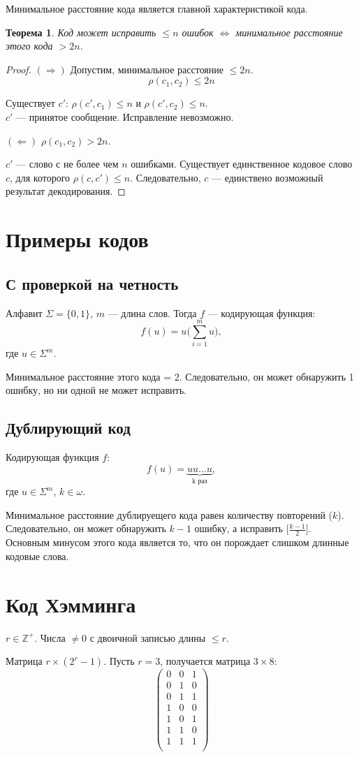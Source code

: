 \documentclass[a4paper,14pt, draft]{report}
\newtheorem{theorem}{Теорема}
\begin{document}
Минимальное расстояние кода является главной характеристикой кода.

\begin{theorem}Код может исправить $\le n$ ошибок $\Leftrightarrow$ минимальное расстояние этого кода $>2n$.
\end{theorem}
\begin{proof}$(\Rightarrow)$ Допустим, минимальное расстояние $\le 2n$. $$\rho(c_1, c_2)\le 2n$$

Существует $c'$: $\rho(c', c_1)\le n$ и $\rho(c', c_2)\le n$.\\$c'$ --- принятое сообщение. Исправление невозможно.

$(\Leftarrow)$ $\rho(c_1, c_2) > 2n$.

$c'$ --- слово с не более чем $n$ ошибками. Существует единственное кодовое слово $c$, для которого $\rho(c, c')\le n$. Следовательно, $c$ --- единствено возможный результат декодирования.
\end{proof}
\section{Примеры кодов}
\subsection{С проверкой на четность}
Алфавит $\Sigma = \{0, 1\}$, $m$ --- длина слов. Тогда $f$ --- кодирующая функция: $$f(u) = u \Big(\sum^m_{i=1} u\Big),$$ где $u\in\Sigma^m$.

Минимальное расстояние этого кода = 2. Следовательно, он может обнаружить 1 ошибку, но ни одной не может исправить.
\subsection{Дублирующий код}
Кодирующая функция $f$: $$f(u) = \underbrace{uu\ldots u}_\text{k раз},$$ где $u\in\Sigma^m$, $k\in\omega$.

Минимальное расстояние дублируещего кода равен количеству повторений ($k$). Следовательно, он может обнаружить $k-1$ ошибку, а исправить $\big[\frac{k-1}{2}\big]$. Основным минусом этого кода является то, что он порождает слишком длинные кодовые слова.
\section{Код Хэмминга}
$r\in\mathbb{Z^+}$. Числа $\neq0$ с двоичной записью длины $\le r$.

Матрица $r\times(2^r-1)$. Пусть $r = 3$, получается матрица $3\times8$:\[
\begin{pmatrix}
    0&0&1\\
    0&1&0\\
    0&1&1\\
    1&0&0\\
    1&0&1\\
    1&1&0\\
    1&1&1\\
\end{pmatrix}\]
\end{document}
